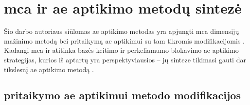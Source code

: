 \section{\gls{mca} ir \LIME \gls{ae} aptikimo metodų sintezė}\label{sec:method}

Šio darbo autoriaus siūlomas \gls{ae} aptikimo metodas yra apjungti \gls{mca} dimensijų
mažinimo metodą bei \LIME pritaikymą \gls{ae} aptikimui su tam tikromis
modifikacijomis . Kadangi \gls{mca} ir \LIME atitinka
bazės keitimo  ir perkeliamumo
blokavimo  \gls{ae} aptikimo
strategijas, kurios iš aptartų yra perspektyviausios -- jų sinteze tikimasi
gauti dar tikslesnį \gls{ae} aptikimo metodą .

\subsection{\LIME pritaikymo \gls{ae} aptikimui metodo modifikacijos}\label{sec:method:mods}

